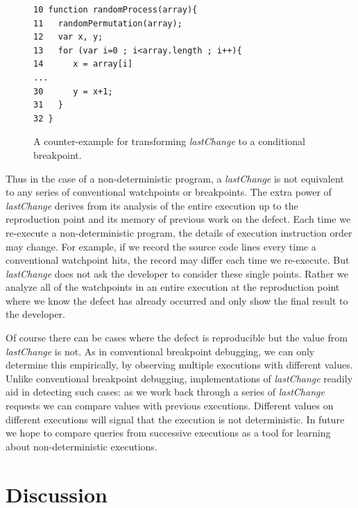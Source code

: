 \documentclass[preprint]{sigplanconf}
\begin{document}
\begin{figure}[htp]
\begin{verbatim}
10 function randomProcess(array){
11   randomPermutation(array);
12   var x, y;
13   for (var i=0 ; i<array.length ; i++){
14      x = array[i]
...
30      y = x+1;
31   }
32 }
\end{verbatim}
\caption{A counter-example for transforming \textit{lastChange} to a conditional breakpoint.}
\label{fig:counter-example}
\end{figure}
 

Thus in the case of a non-deterministic program, a \textit{lastChange}
is not equivalent to any series of conventional watchpoints or
breakpoints. The extra power of \textit{lastChange} derives from its
analysis of the entire execution up to the reproduction point and its
memory of previous work on the defect.  Each time we re-execute a
non-deterministic program, the details of execution instruction order
may change. For example, if we record the source code lines every time
a conventional watchpoint hits, the record may differ each time we
re-execute. But \textit{lastChange} does not ask the developer to
consider these single points.  Rather we analyze all of the
watchpoints in an entire execution at the reproduction point where we
know the defect has already occurred and only show the final result to
the developer.

Of course there can be cases where the defect is reproducible but the
value from \textit{lastChange} is not. As in conventional breakpoint
debugging, we can only determine this empirically, by observing
multiple executions with different values. Unlike conventional
breakpoint debugging, implementations of \textit{lastChange} readily
aid in detecting such cases: as we work back through a series of
\textit{lastChange} requests we can compare values with previous
executions. Different values on different executions will signal that
the execution is not deterministic. In future we hope to compare
queries from successive executions as a tool for learning about
non-deterministic executions.


\section{Discussion}
\end{document}
